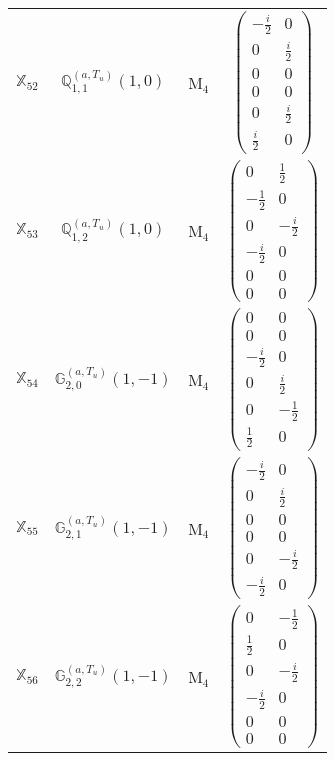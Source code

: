 \documentclass[fleqn,10pt,landscape]{article}
\begin{document}
\begin{itemize}
\begin{center}
\begin{longtable}{c|c|c|c}
$ \mathbb{X}_{52} $ & $\mathbb{Q}_{1,1}^{(a,T_{u})}(1,0)$ & M$_{4}$ & $\begin{pmatrix} - \frac{i}{2} & 0 \\ 0 & \frac{i}{2} \\ 0 & 0 \\ 0 & 0 \\ 0 & \frac{i}{2} \\ \frac{i}{2} & 0 \end{pmatrix}$ \\
$ \mathbb{X}_{53} $ & $\mathbb{Q}_{1,2}^{(a,T_{u})}(1,0)$ & M$_{4}$ & $\begin{pmatrix} 0 & \frac{1}{2} \\ - \frac{1}{2} & 0 \\ 0 & - \frac{i}{2} \\ - \frac{i}{2} & 0 \\ 0 & 0 \\ 0 & 0 \end{pmatrix}$ \\
$ \mathbb{X}_{54} $ & $\mathbb{G}_{2,0}^{(a,T_{u})}(1,-1)$ & M$_{4}$ & $\begin{pmatrix} 0 & 0 \\ 0 & 0 \\ - \frac{i}{2} & 0 \\ 0 & \frac{i}{2} \\ 0 & - \frac{1}{2} \\ \frac{1}{2} & 0 \end{pmatrix}$ \\
$ \mathbb{X}_{55} $ & $\mathbb{G}_{2,1}^{(a,T_{u})}(1,-1)$ & M$_{4}$ & $\begin{pmatrix} - \frac{i}{2} & 0 \\ 0 & \frac{i}{2} \\ 0 & 0 \\ 0 & 0 \\ 0 & - \frac{i}{2} \\ - \frac{i}{2} & 0 \end{pmatrix}$ \\
$ \mathbb{X}_{56} $ & $\mathbb{G}_{2,2}^{(a,T_{u})}(1,-1)$ & M$_{4}$ & $\begin{pmatrix} 0 & - \frac{1}{2} \\ \frac{1}{2} & 0 \\ 0 & - \frac{i}{2} \\ - \frac{i}{2} & 0 \\ 0 & 0 \\ 0 & 0 \end{pmatrix}$ \\

\end{longtable}
\end{center}
\end{itemize}
\end{document}
